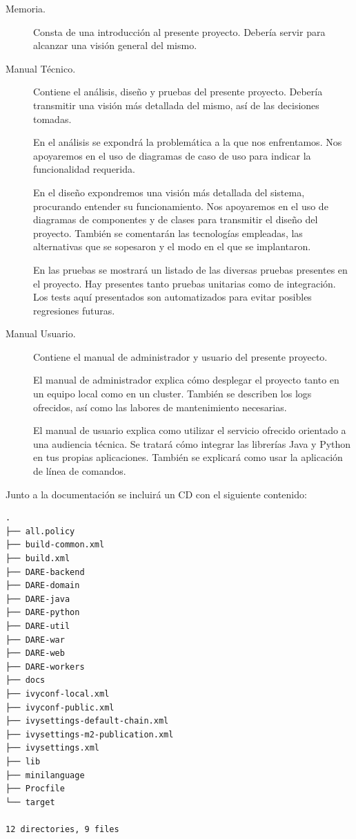 \begin{description}

    \item[Memoria.] Consta de una introducción al presente
      proyecto. Debería servir para alcanzar una visión general del
      mismo.
    \item[Manual Técnico.] Contiene el análisis, diseño y pruebas del
      presente proyecto. Debería transmitir una visión más detallada
      del mismo, así de las decisiones tomadas.

      En el análisis se expondrá la problemática a la que nos
      enfrentamos. Nos apoyaremos en el uso de diagramas de caso de
      uso para indicar la funcionalidad requerida.

      En el diseño expondremos una visión más detallada del sistema,
      procurando entender su funcionamiento. Nos apoyaremos en el uso
      de diagramas de componentes y de clases para transmitir el
      diseño del proyecto. También se comentarán las tecnologías
      empleadas, las alternativas que se sopesaron y el modo en el que
      se implantaron.

      En las pruebas se mostrará un listado de las diversas pruebas
      presentes en el proyecto. Hay presentes tanto pruebas unitarias
      como de integración. Los tests aquí presentados son
      automatizados para evitar posibles regresiones futuras.

    \item[Manual Usuario.] Contiene el manual de administrador y
      usuario del presente proyecto.

      El manual de administrador explica cómo desplegar el proyecto
      tanto en un equipo local como en un cluster. También se
      describen los logs ofrecidos, así como las labores de
      mantenimiento necesarias.

      El manual de usuario explica como utilizar el servicio ofrecido
      orientado a una audiencia técnica. Se tratará cómo integrar las
      librerías Java y Python en tus propias aplicaciones. También se
      explicará como usar la aplicación de línea de comandos.
\end{description}

Junto a la documentación se incluirá un CD con el siguiente contenido:

\begin{verbatim}
.
├── all.policy
├── build-common.xml
├── build.xml
├── DARE-backend
├── DARE-domain
├── DARE-java
├── DARE-python
├── DARE-util
├── DARE-war
├── DARE-web
├── DARE-workers
├── docs
├── ivyconf-local.xml
├── ivyconf-public.xml
├── ivysettings-default-chain.xml
├── ivysettings-m2-publication.xml
├── ivysettings.xml
├── lib
├── minilanguage
├── Procfile
└── target

12 directories, 9 files
\end{verbatim}

